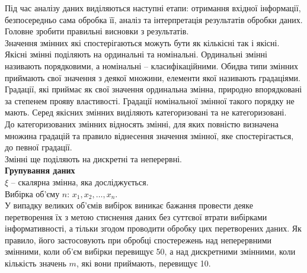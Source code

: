 




Під час аналізу даних виділяються наступні етапи: отримання вхідної інформації, безпосередньо сама обробка її, аналіз та інтерпретація результатів обробки даних. \\

Головне зробити правильні висновки з результатів. \\

Значення змінних які спостерігаються можуть бути як кількісні так і якісні. Якісні змінні поділяють на ординальні та номінальні. Ординальні змінні називають порядковими, а номінальні -- класифікаційними. Обидва типи змінних приймають свої значення з деякої множини, елементи якої називають градаціями. Градації, які приймає як свої значення ординальна змінна, природно впорядковані за степенем прояву властивості. Градації номінальної змінної такого порядку не мають. Серед якісних змінних виділяють категоризовані та не категоризовані. \\

До категоризованих змінних відносять змінні, для яких повністю визначена множина градацій та правило віднесення значення змінної, яке спостерігається, до певної градації. \\

Змінні ще поділяють на дискретні та неперервні. \\

\textbf{Групування даних} \\

$\xi$ -- скалярна змінна, яка досліджується. \\

Вибірка об'єму $n$: $x_1, x_2, \ldots, x_n$. \\

У випадку великих об'ємів вибірок виникає бажання провести деяке перетворення їх з метою стиснення даних без суттєвої втрати вибірками інформативності, а тільки згодом проводити обробку цих перетворених даних. Як правило, його застосовують при обробці спостережень над неперервними змінними, коли об'єм вибірки перевищує 50, а над дискретними змінними, коли кількість значень $m$, які вони приймають, перевищує 10. \\

